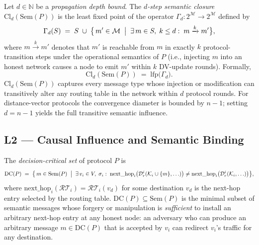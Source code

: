 \begin{definition}
\label{def:semantic-closure}
Let $d \in \mathbb{N}$ be a \emph{propagation depth bound}.
The \emph{$d$-step semantic closure} $\mathrm{Cl}_d(\mathrm{Sem}(P))$ is the
least fixed point of the operator
$\Gamma_d : 2^{\mathcal{M}} \to 2^{\mathcal{M}}$ defined by
\[
  \Gamma_d(S) \;=\; S \;\cup\;
  \bigl\{\, m' \in \mathcal{M} \;\bigm|\;
    \exists\, m \in S,\; k \le d :\;
    m \xrightarrow{k} m'
  \bigr\},
\]
where $m \xrightarrow{k} m'$ denotes that $m'$ is reachable from $m$ in
exactly $k$ protocol-transition steps under the operational semantics of
$P$ (i.e., injecting $m$ into an honest network causes a node to emit
$m'$ within $k$ DV-update rounds).
Formally,
\[
  \mathrm{Cl}_d(\mathrm{Sem}(P))
  \;=\;
  \mathrm{lfp}\bigl(\Gamma_d\bigr).
\]
$\mathrm{Cl}_d(\mathrm{Sem}(P))$ captures every message type whose
injection or modification can transitively alter any routing table in the
network within $d$ protocol rounds.  For distance-vector protocols the
convergence diameter is bounded by $n-1$; setting $d = n-1$ yields the
full transitive semantic influence.
\end{definition}

\subsection{L2 — Causal Influence and Semantic Binding}
\label{subsec:l2-causal}

\begin{definition}
\label{def:decision-critical}
The \emph{decision-critical set} of protocol $P$ is
\[
  \mathrm{DC}(P) \;=\;
  \bigl\{\, m \in \mathrm{Sem}(P) \;\bigm|\;
    \exists\, v_i \in V,\; \sigma_i :\;
    \mathrm{next\_hop}_i\!\left(\mathcal{D}_r^i(\mathcal{K}_i \cup \{m\}, \ldots)\right)
    \neq
    \mathrm{next\_hop}_i\!\left(\mathcal{D}_r^i(\mathcal{K}_i, \ldots)\right)
  \bigr\},
\]
where $\mathrm{next\_hop}_i(\mathcal{RT}_i) = \mathcal{RT}_i(v_d)$ for some
destination $v_d$ is the next-hop entry selected by the routing table.
$\mathrm{DC}(P) \subseteq \mathrm{Sem}(P)$ is the minimal subset of semantic
messages whose forgery or manipulation is \emph{sufficient} to install an
arbitrary next-hop entry at any honest node: an adversary who can produce
an arbitrary message $m \in \mathrm{DC}(P)$ that is accepted by $v_i$ can
redirect $v_i$'s traffic for any destination.
\end{definition}

